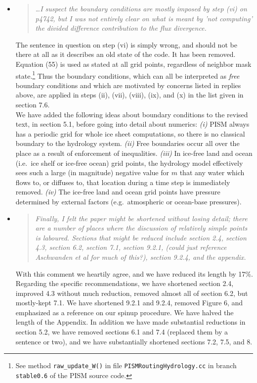 \documentclass[11pt,reqno]{amsart}
\newcommand{\reply}[2]{
\medskip\medskip
\item  \begin{quote}
\emph{#1}
\end{quote}

\medskip
\noindent #2}
\begin{document}
\begin{itemize}
\reply{ \dots  I suspect the boundary conditions are mostly imposed by step (vi) on p4742, but I was not entirely clear on what is meant by 'not computing' the divided difference contribution to the flux divergence.}
{The sentence in question on step (vi) is simply wrong, and should not be there at all as it describes an old state of the code.  It has been removed.  \\
\indent Equation (55) is used as stated at all grid points, regardless of neighbor mask state.\footnote{See method \texttt{raw\_update\_W()} in file \texttt{PISMRoutingHydrology.cc} in branch \texttt{stable0.6} of the PISM source code.}  Thus the boundary conditions, which can all be interpreted as \emph{free} boundary conditions and which are motivated by concerns listed in replies above, are applied in steps (ii), (vii), (viii), (ix), and (x) in the list given in section 7.6. \\
\indent We have added the following ideas about boundary conditions to the revised text, in section 5.1, before going into detail about numerics: \emph{(i)} PISM always has a periodic grid for whole ice sheet computations, so there is no classical boundary to the hydrology system.  \emph{(ii)} Free boundaries occur all over the place as a result of enforcement of inequalities.  \emph{(iii)} In ice-free land and ocean (i.e.~ice shelf or ice-free ocean) grid points, the hydrology model effectively sees such a large (in magnitude) negative value for $m$ that any water which flows to, or diffuses to, that location during a time step is immediately removed.  \emph{(iv)} The ice-free land and ocean grid points have pressure determined by external factors (e.g.~atmospheric or ocean-base pressures).}

\reply{Finally, I felt the paper might be shortened without losing detail; there are a number of places where the discussion of relatively simple points is laboured. Sections that might be reduced include section 2.4, section 4.3, section 6.2, section 7.1, section 9.2.1, (could just reference Aschwanden et al for much of this?), section 9.2.4, and the appendix.}
{With this comment we heartily agree, and we have reduced its length by 17\%.  Regarding the specific recommendations, we have shortened section 2.4, improved 4.3 without much reduction, removed almost all of section 6.2, but mostly-kept 7.1.  We have shortened 9.2.1 and 9.2.4, removed Figure 6, and emphasized \cite{AschwandenAdalgeirsdottirKhroulev} as a reference on our spinup procedure.  We have halved the length of the Appendix.  In addition we have made substantial reductions in section 5.2, we have removed sections 6.1 and 7.4 (replaced them by a sentence or two), and we have substantially shortened sections 7.2, 7.5, and 8.}


\end{itemize}
\end{document}
